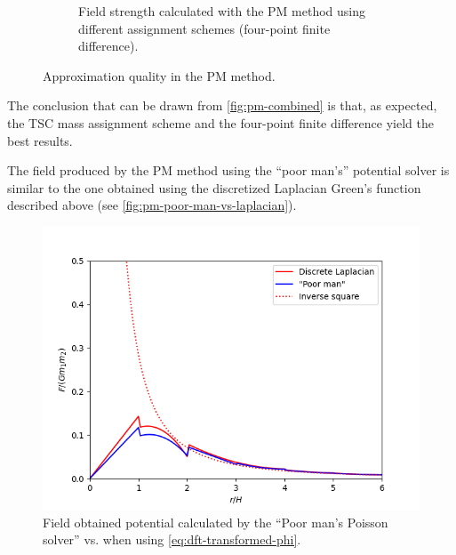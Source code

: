 \begin{figure}[!ht]
\begin{subfigure}[t]{0.48\textwidth}
        \caption{Field strength calculated with the PM method using different assignment schemes (four-point finite difference).}
        \label{fig:pm-mass-assignment-field-strength}
    \end{subfigure}
    \caption{Approximation quality in the PM method.}
    \label{fig:pm-combined}
\end{figure}
The conclusion that can be drawn from \autoref{fig:pm-combined} is that, as expected, the TSC mass assignment scheme and the four-point finite difference yield the best results.

The field produced by the PM method using the ``poor man's'' potential solver is similar to the one obtained using the discretized Laplacian Green's function described above (see \autoref{fig:pm-poor-man-vs-laplacian}).
\begin{figure}[!ht]
    \centering
    \includegraphics[scale=0.55]{chapters/pm-method/img/poor-man-vs-laplacian.png}
    \caption{Field obtained potential calculated by the ``Poor man's Poisson solver'' vs. when using \autoref{eq:dft-transformed-phi}.}
    \label{fig:pm-poor-man-vs-laplacian}
\end{figure}

